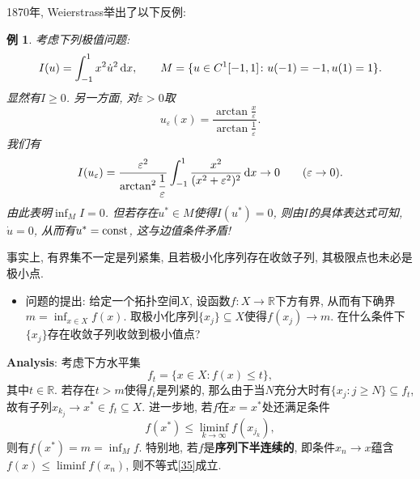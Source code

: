 \documentclass[12pt,a4paper]{article}
\newtheorem{example}[theorem]{例}
\begin{document}
1870年, Weierstrass举出了以下反例:

\begin{example}
    考虑下列极值问题:
    \begin{equation*}
        I(u) = \int_{-1}^1x^2\dot u^2 \,{\rm d}x, \qquad M = \{u \in C^1[-1, 1]\colon u(-1) = -1, u(1) = 1\}.
    \end{equation*}
    显然有$I \geq 0$. 另一方面, 对$\varepsilon > 0$取 
    \begin{equation*}
        u_{\varepsilon}(x) = \frac{\arctan \displaystyle\frac{x}{\varepsilon}}{\arctan \displaystyle\frac{1}{\varepsilon}}.
    \end{equation*}
    我们有 
    \begin{equation*}
        I(u_{\varepsilon}) = \frac{\varepsilon^2}{\arctan^2\displaystyle\frac{1}{\varepsilon}}\int_{-1}^1\frac{x^2}{(x^2 + \varepsilon^2)^2} \,{\rm d}x \rightarrow 0 \qquad (\varepsilon \rightarrow 0).
    \end{equation*}
    由此表明$\inf_MI = 0$. 但若存在$u^* \in M$使得$I(u^*) = 0$, 则由$I$的具体表达式可知, $\dot u = 0$, 从而有$u^* = {\rm const}$, 这与边值条件矛盾!
\end{example}

事实上, 有界集不一定是列紧集, 且若极小化序列存在收敛子列, 其极限点也未必是极小点.

\begin{itemize}
    \item 问题的提出: 给定一个拓扑空间$X$, 设函数$f\colon X \rightarrow \mathbb{R}$下方有界, 从而有下确界$m = \inf_{x \in X}f(x)$.
    取极小化序列$\{x_j\} \subseteq X$使得$f(x_j) \rightarrow m$. 在什么条件下$\{x_j\}$存在收敛子列收敛到极小值点?    
\end{itemize}

\textbf{Analysis}: 考虑下方水平集 
\begin{equation*}
    f_t = \{x \in X\colon f(x) \leq t\},
\end{equation*}
其中$t \in \mathbb{R}$. 若存在$t > m$使得$f_t$是列紧的, 那么由于当$N$充分大时有$\{x_j\colon j \geq N\} \subseteq f_t$, 故有子列$x_{k_j} \rightarrow x^* \in f_t \subseteq X$. 
进一步地, 若$f$在$x = x^*$处还满足条件 
\begin{equation}\label{35}
    f(x^*) \leq \liminf\limits_{k \rightarrow \infty}f(x_{j_k}),
\end{equation}
则有$f(x^*) = m = \inf_Mf$. 特别地, 若$f$是\textbf{序列下半连续的}, 即条件$x_n \rightarrow x$蕴含$f(x) \leq \liminf f(x_n)$, 则不等式\eqref{35}成立.
\end{document}
